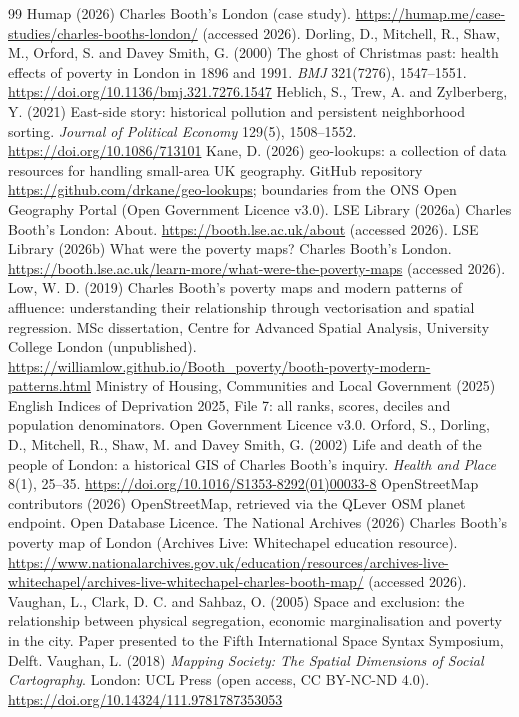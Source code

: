 
\begin{thebibliography}{99}\small
{} Humap (2026) Charles Booth's London (case study). \url{https://humap.me/case-studies/charles-booths-london/} (accessed 2026).
 Dorling, D., Mitchell, R., Shaw, M., Orford, S. and Davey Smith, G. (2000) The ghost of Christmas past: health effects of poverty in London in 1896 and 1991. \textit{BMJ} 321(7276), 1547--1551. \url{https://doi.org/10.1136/bmj.321.7276.1547}
 Heblich, S., Trew, A. and Zylberberg, Y. (2021) East-side story: historical pollution and persistent neighborhood sorting. \textit{Journal of Political Economy} 129(5), 1508--1552. \url{https://doi.org/10.1086/713101}
 Kane, D. (2026) geo-lookups: a collection of data resources for handling small-area UK geography. GitHub repository \url{https://github.com/drkane/geo-lookups}; boundaries from the ONS Open Geography Portal (Open Government Licence v3.0).
 LSE Library (2026a) Charles Booth's London: About. \url{https://booth.lse.ac.uk/about} (accessed 2026).
 LSE Library (2026b) What were the poverty maps? Charles Booth's London. \url{https://booth.lse.ac.uk/learn-more/what-were-the-poverty-maps} (accessed 2026).
 Low, W. D. (2019) Charles Booth's poverty maps and modern patterns of affluence: understanding their relationship through vectorisation and spatial regression. MSc dissertation, Centre for Advanced Spatial Analysis, University College London (unpublished). \url{https://williamlow.github.io/Booth_poverty/booth-poverty-modern-patterns.html}
 Ministry of Housing, Communities and Local Government (2025) English Indices of Deprivation 2025, File 7: all ranks, scores, deciles and population denominators. Open Government Licence v3.0.
 Orford, S., Dorling, D., Mitchell, R., Shaw, M. and Davey Smith, G. (2002) Life and death of the people of London: a historical GIS of Charles Booth's inquiry. \textit{Health and Place} 8(1), 25--35. \url{https://doi.org/10.1016/S1353-8292(01)00033-8}
 OpenStreetMap contributors (2026) OpenStreetMap, retrieved via the QLever OSM planet endpoint. Open Database Licence.
 The National Archives (2026) Charles Booth's poverty map of London (Archives Live: Whitechapel education resource). \url{https://www.nationalarchives.gov.uk/education/resources/archives-live-whitechapel/archives-live-whitechapel-charles-booth-map/} (accessed 2026).
 Vaughan, L., Clark, D. C. and Sahbaz, O. (2005) Space and exclusion: the relationship between physical segregation, economic marginalisation and poverty in the city. Paper presented to the Fifth International Space Syntax Symposium, Delft.
 Vaughan, L. (2018) \textit{Mapping Society: The Spatial Dimensions of Social Cartography}. London: UCL Press (open access, CC BY-NC-ND 4.0). \url{https://doi.org/10.14324/111.9781787353053}
\end{thebibliography}

